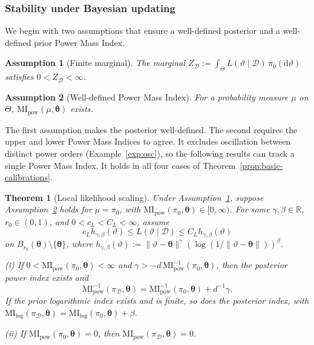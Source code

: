 \documentclass[11pt,a4paper]{article}
\newcommand{\R}{\mathbb{R}}
\newcommand{\MI}{\mathrm{MI}}
\newcommand{\pa}{\boldsymbol\theta}
\theoremstyle{compactplain}
\newtheorem{theorem}{Theorem}[section]
\newtheorem{assumption}{Assumption}
\theoremstyle{compactdefinition}
\numberwithin{equation}{section}
\begin{document}
\subsubsection{Stability under Bayesian updating}

We begin with two assumptions that ensure a well-defined
posterior and a well-defined prior Power Mass Index.

\begin{assumption}[Finite marginal]\label{as:bayes}
The marginal \(Z_{\mathcal D}:=\int_\Theta L(\vartheta\mid\mathcal D)\,\pi_0(\mathrm d\vartheta)\) satisfies \(0<Z_{\mathcal D}<\infty\).
\end{assumption}

\begin{assumption}[Well-defined Power Mass Index]\label{as:existence}
For a probability measure \(\mu\) on \(\Theta\), \(\MI_{\mathrm{pow}}(\mu,\pa)\) exists.
\end{assumption}

The first assumption makes the posterior well-defined. The second requires the upper and lower Power Mass Indices to agree. It excludes oscillation between distinct power orders (Example~\ref{exp:osc}), so the following results can track a single Power Mass Index. It holds in all four cases of Theorem~\ref{prop:basic-calibrations}.

\begin{theorem}[Local likelihood scaling]\label{thm:local-likelihood-scaling}
Under Assumption~\ref{as:bayes}, suppose Assumption~\ref{as:existence} holds for \(\mu=\pi_0\), with \(\MI_{\mathrm{pow}}(\pi_0,\pa)\in[0,\infty)\). For some \(\gamma,\beta\in\R\), \(r_0\in(0,1)\), and \(0<c_L<C_L<\infty\), assume
\[
c_Lh_{\gamma,\beta}(\vartheta)\le L(\vartheta\mid\mathcal D)
\le C_Lh_{\gamma,\beta}(\vartheta)
\]
on \(B_{r_0}(\pa)\setminus\{\pa\}\), where \(h_{\gamma,\beta}(\vartheta):=\|\vartheta-\pa\|^\gamma(\log(1/\|\vartheta-\pa\|))^\beta\).

\textnormal{(i)} If \(0<\MI_{\mathrm{pow}}(\pi_0,\pa)<\infty\) and \(\gamma>-d\,\MI_{\mathrm{pow}}^{-1}(\pi_0,\pa)\), then the posterior power index exists and
\[
\MI_{\mathrm{pow}}^{-1}(\pi_{\mathcal D},\pa)
=\MI_{\mathrm{pow}}^{-1}(\pi_0,\pa)+d^{-1}\gamma.
\]
If the prior logarithmic index exists and is finite, so does the posterior index, with
\(\MI_{\mathrm{log}}(\pi_{\mathcal D},\pa) =\MI_{\mathrm{log}}(\pi_0,\pa)+\beta\).

\textnormal{(ii)} If \(\MI_{\mathrm{pow}}(\pi_0,\pa)=0\), then \(\MI_{\mathrm{pow}}(\pi_{\mathcal D},\pa)=0\).
\end{theorem}
\end{document}
